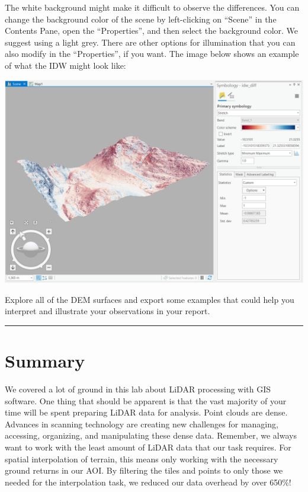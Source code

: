 \documentclass[
]{book}
\begin{document}
The white background might make it difficult to observe the differences. You can change the background color of the scene by left-clicking on ``Scene'' in the Contents Pane, open the ``Properties'', and then select the background color. We suggest using a light grey. There are other options for illumination that you can also modify in the ``Properties'', if you want. The image below shows an example of what the IDW might look like:

\includegraphics[width=1\linewidth]{images/01-arcgis-idw-diff}

Explore all of the DEM surfaces and export some examples that could help you interpret and illustrate your observations in your report.

\begin{center}\rule{0.5\linewidth}{0.5pt}\end{center}

\hypertarget{summary}{%
\section*{Summary}\label{summary}}

We covered a lot of ground in this lab about LiDAR processing with GIS software. One thing that should be apparent is that the vast majority of your time will be spent preparing LiDAR data for analysis. Point clouds are dense. Advances in scanning technology are creating new challenges for managing, accessing, organizing, and manipulating these dense data. Remember, we always want to work with the least amount of LiDAR data that our task requires. For spatial interpolation of terrain, this means only working with the necessary ground returns in our AOI. By filtering the tiles and points to only those we needed for the interpolation task, we reduced our data overhead by over 650\%!
\end{document}
